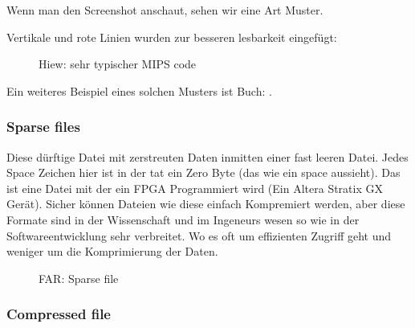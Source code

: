 
Wenn man den Screenshot anschaut, sehen wir eine Art Muster.

Vertikale und rote Linien wurden zur besseren lesbarkeit eingefügt:

\begin{figure}[H]
\centering
{}
\caption{Hiew: sehr typischer MIPS code}
\end{figure}

Ein weiteres Beispiel eines solchen Musters ist Buch:
.

\clearpage
\subsubsection{Sparse files}

Diese dürftige Datei mit zerstreuten Daten inmitten einer fast leeren Datei.
Jedes Space Zeichen hier ist in der tat ein Zero Byte (das wie ein space aussieht). %
Das ist eine Datei mit der ein FPGA Programmiert wird (Ein Altera Stratix GX Gerät).
Sicher können Dateien wie diese einfach Kompremiert werden, aber diese Formate sind in 
der Wissenschaft und im Ingeneurs wesen so wie in der Softwareentwicklung sehr verbreitet.
Wo es oft um effizienten Zugriff geht und weniger um die Komprimierung der Daten.


\begin{figure}[H]
\centering
{}
\caption{FAR: Sparse file}
\end{figure}

\clearpage
\subsubsection{Compressed file}


